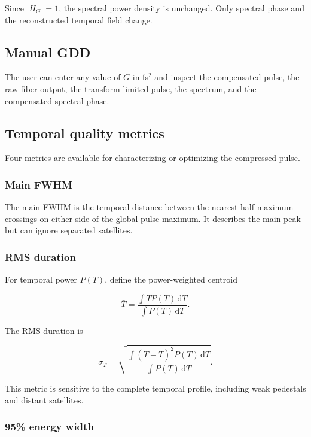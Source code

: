 \documentclass[11pt,a4paper]{article}
\newcommand{\dd}{\mathrm{d}}
\begin{document}
Since $|H_G|=1$, the spectral power density is unchanged. Only spectral phase
and the reconstructed temporal field change.

\subsection{Manual GDD}

The user can enter any value of $G$ in fs$^2$ and inspect the compensated pulse,
the raw fiber output, the transform-limited pulse, the spectrum, and the
compensated spectral phase.

\subsection{Temporal quality metrics}

Four metrics are available for characterizing or optimizing the compressed
pulse.

\subsubsection{Main FWHM}

The main FWHM is the temporal distance between the nearest half-maximum
crossings on either side of the global pulse maximum. It describes the main
peak but can ignore separated satellites.

\subsubsection{RMS duration}

For temporal power $P(T)$, define the power-weighted centroid

\begin{equation}
\bar T
=
\frac{\int T P(T)\,\dd T}
{\int P(T)\,\dd T}.
\end{equation}

The RMS duration is

\begin{equation}
\boxed{
\sigma_T
=
\sqrt{
\frac{\int(T-\bar T)^2P(T)\,\dd T}
{\int P(T)\,\dd T}
}.
}
\end{equation}

This metric is sensitive to the complete temporal profile, including weak
pedestals and distant satellites.

\subsubsection{95\% energy width}
\end{document}
